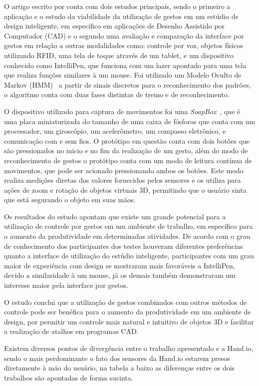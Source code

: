 O artigo escrito por \cite{accelerometer:2006} conta com dois estudos principais, sendo o primeiro a aplicação e o estudo da viabilidade da utilização de gestos em um estúdio de design inteligente, em específico em aplicações de Desenho Assistido por Computador (CAD) e o segundo uma avaliação e comparação da interface por gestos em relação a outras modalidades como: controle por voz, objetos físicos utilizando RFID, uma tela de toque através de um tablet, e um dispositivo conhecido como IntelliPen, que funciona com um lazer apontado para uma tela que realiza funções similares à um mouse. Foi utilizado um Modelo Oculto de Markov (HMM)~\cite{hmm:1989} a partir de sinais discretos para o reconhecimento dos padrões, o algoritmo conta com duas fases distintas de treino e de reconhecimento.


O dispositivo utilizado para captura de movimentos foi uma \textit{SoapBox}~\cite{soapbox:2002}, que é uma placa miniaturizada do tamanho de uma caixa de fósforos que conta com um processador, um giroscópio, um acelerômetro, um compasso eletrônico, e comunicação com e sem fios. O protótipo em questão conta com dois botões que são pressionados no inicio e no fim da realização de um gesto, além do modo de reconhecimento de gestos o protótipo conta com um modo de leitura contínua de movimentos, que pode ser acionado pressionando ambos os botões. Este modo realiza medições diretas dos valores fornecidos pelos sensores e os utiliza para ações de zoom e rotação de objetos virtuais 3D, permitindo que o usuário sinta que está segurando o objeto em suas mãos.

Os resultados do estudo apontam que existe um grande potencial para a utilização de controle por gestos em um ambiente de trabalho, em específico para o aumento da produtividade em determinadas atividades. De acordo com o grau de conhecimento dos participantes dos testes houveram diferentes preferências quanto a interface de utilização do estúdio inteligente, participantes com um grau maior de experiência com design se mostraram mais favoráveis a IntelliPen, devido a similaridade à um mouse, já os demais também demonstraram um interesse maior pela interface por gestos. 

O estudo conclui que a utilização de gestos combinados com outros métodos de controle pode ser benéfica para o aumento da produtividade em um ambiente de design, por permitir um controle mais natural e intuitivo de objetos 3D e facilitar a realização de atalhos em programas CAD.

Existem diversos pontos de divergência entre o trabalho apresentado e a Hand.io, sendo o mais perdominante o fato dos sensores da Hand.io estarem presos diretamente à mão do usuário, na tabela a baixo as diferenças entre os dois trabalhos são apontadas de forma sucinta.

